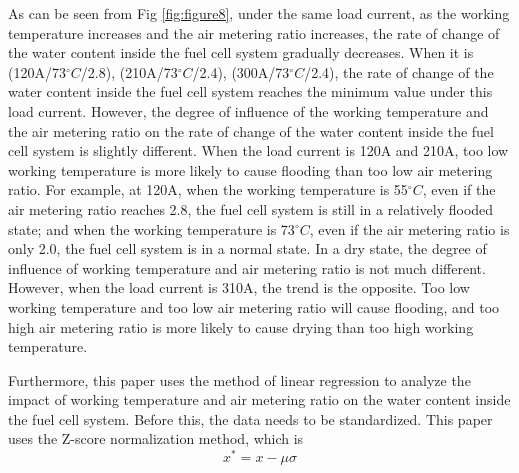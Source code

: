 As can be seen from Fig \ref{fig:figure8}, under the same load current, as the working temperature increases and the air metering ratio increases, the rate of change of the water content inside the fuel cell system gradually decreases. When it is (120A/73$^{\circ}C$/2.8), (210A/73$^{\circ}C$/2.4), (300A/73$^{\circ}C$/2.4), the rate of change of the water content inside the fuel cell system reaches the minimum value under this load current. However, the degree of influence of the working temperature and the air metering ratio on the rate of change of the water content inside the fuel cell system is slightly different. When the load current is 120A and 210A, too low working temperature is more likely to cause flooding than too low air metering ratio. For example, at 120A, when the working temperature is 55$^{\circ}C$, even if the air metering ratio reaches 2.8, the fuel cell system is still in a relatively flooded state; and when the working temperature is 73$^{\circ}C$, even if the air metering ratio is only 2.0, the fuel cell system is in a normal state. In a dry state, the degree of influence of working temperature and air metering ratio is not much different. However, when the load current is 310A, the trend is the opposite. Too low working temperature and too low air metering ratio will cause flooding, and too high air metering ratio is more likely to cause drying than too high working temperature.
\par
Furthermore, this paper uses the method of linear regression to analyze the impact of working temperature and air metering ratio on the water content inside the fuel cell system. Before this, the data needs to be standardized. This paper uses the Z-score normalization method\cite{altman2013predicting,camska2013predicting}, which is
$$x^{*}=x-\mu\sigma$$

